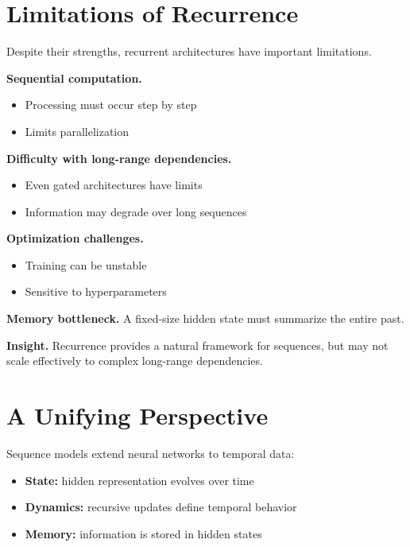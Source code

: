 \section{Limitations of Recurrence}

Despite their strengths, recurrent architectures have important limitations.

\medskip

\noindent
\textbf{Sequential computation.}
\begin{itemize}
    \item Processing must occur step by step
    \item Limits parallelization
\end{itemize}

\medskip

\noindent
\textbf{Difficulty with long-range dependencies.}
\begin{itemize}
    \item Even gated architectures have limits
    \item Information may degrade over long sequences
\end{itemize}

\medskip

\noindent
\textbf{Optimization challenges.}
\begin{itemize}
    \item Training can be unstable
    \item Sensitive to hyperparameters
\end{itemize}

\medskip

\noindent
\textbf{Memory bottleneck.}  
A fixed-size hidden state must summarize the entire past.

\medskip

\noindent
\textbf{Insight.}  
Recurrence provides a natural framework for sequences, but may not scale effectively to complex long-range dependencies.

\section{A Unifying Perspective}

Sequence models extend neural networks to temporal data:

\begin{itemize}
    \item \textbf{State:} hidden representation evolves over time
    \item \textbf{Dynamics:} recursive updates define temporal behavior
    \item \textbf{Memory:} information is stored in hidden states
\end{itemize}


